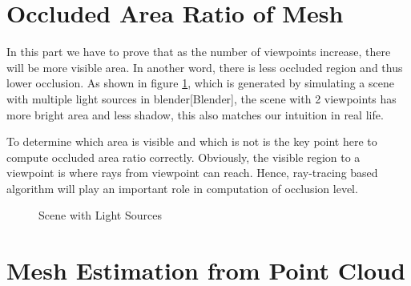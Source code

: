\documentclass[11pt, a4paper,oneside,chapterprefix=false]{scrbook}
\begin{document}
\section{Occluded Area Ratio of Mesh} \label{sec:occluded area ratio of mesh}

In this part we have to prove that as the number of viewpoints increase, there will be more visible area. In another word, there is less occluded region and thus lower occlusion. As shown in figure \ref{fig:scene with light sources}, which is generated by simulating a scene with multiple light sources in blender[Blender], the scene with 2 viewpoints has more bright area and less shadow, this also matches our intuition in real life. 

\vspace{10pt}

To determine which area is visible and which is not is the key point here to compute occluded area ratio correctly. Obviously, the visible region to a viewpoint is where rays from viewpoint can reach. Hence, ray-tracing based algorithm will play an important role in computation of occlusion level.  

\begin{figure}[H]
    \centering
     \hfill
    \caption{Scene with Light Sources}
    \label{fig:scene with light sources}
\end{figure}

\section{Mesh Estimation from Point Cloud} \label{mesh estimation of point cloud}
\end{document}
